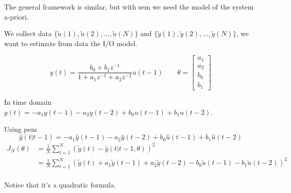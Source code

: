 The general framework is similar, but with \gls{sem} we need the model of the system a-priori.
\begin{example}
    We collect data $\{ \tilde{u}(1), \tilde{u}(2), \dots, \tilde{u}(N) \}$ and $\{ \tilde{y}(1), \tilde{y}(2), \dots, \tilde{y}(N) \}$, we want to estimate from data the I/O model.

    \[
        y(t) = \frac{b_0 + b_1z^{-1}}{1+a_1z^{-1} + a_2z^{-2}}u(t-1) \qquad \theta = \begin{bmatrix}
            a_1 \\ a_2 \\ b_0 \\ b_1
        \end{bmatrix}
    \]

    In time domain $y(t) = -a_1y(t-1)-a_2y(t-2)+b_0u(t-1)+b_1u(t-2)$.

    Using \gls{pem}
    \[
        \hat{y}(t|t-1) = -a_1\hat{y}(t-1)-a_2\hat{y}(t-2)+b_0\hat{u}(t-1)+b_1\hat{u}(t-2)
    \]
    \begin{align*}
        J_N(\theta) &= \frac{1}{N}\sum_{t=1}^N \left( \tilde{y}(t) - \hat{y}(t|t-1, \theta) \right)^2 \\
        &= \frac{1}{N}\sum_{t=1}^N \left( \tilde{y}(t) +a_1\tilde{y}(t-1)+a_2\tilde{y}(t-2)-b_0\tilde{u}(t-1)-b_1\tilde{u}(t-2) \right)^2 \\
    \end{align*}

    Notice that it's a quadratic formula.

    \begin{figure}[H]
        \begin{minipage}[t]{0.5\textwidth}
            \centering
\end{minipage}
\end{figure}
\end{example}
